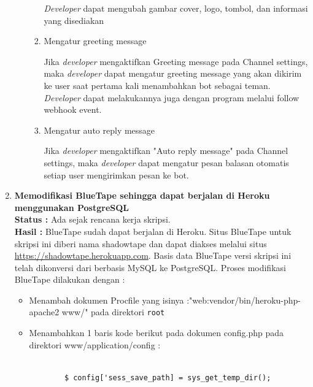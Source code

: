 \documentclass[a4paper,twoside]{article}
\begin{document}
\begin{enumerate}
\begin{enumerate}
\begin{enumerate}
\textit{Developer} dapat mengubah gambar cover, logo, tombol, dan informasi yang disediakan

\item Mengatur greeting message

Jika \textit{developer} mengaktifkan Greeting message pada Channel settings, maka \textit{developer} dapat mengatur greeting message yang akan dikirim ke user saat pertama kali menambahkan bot sebagai teman. \textit{Developer} dapat melakukannya juga dengan program melalui follow webhook event.

\item Mengatur auto reply message

Jika \textit{developer} mengaktifkan "Auto reply message" pada Channel settings, maka \textit{developer} dapat mengatur pesan balasan otomatis setiap user mengirimkan pesan ke bot.
\end{enumerate}
	
	\end{enumerate}
		
	\item \textbf{Memodifikasi BlueTape sehingga dapat berjalan di Heroku menggunakan PostgreSQL}\\
	{\bf Status :} Ada sejak rencana kerja skripsi.\\
	{\bf Hasil :} BlueTape sudah dapat berjalan di Heroku. Situs BlueTape untuk skripsi ini diberi nama shadowtape dan dapat diakses melalui situs \url{https://shadowtape.herokuapp.com}. Basis data BlueTape versi skripsi ini telah dikonversi dari berbasis MySQL ke PostgreSQL. Proses modifikasi BlueTape dilakukan dengan :
	\begin{itemize}
		\item Menambah dokumen Procfile yang isinya :"web:vendor/bin/heroku-php-apache2 www/" pada direktori \texttt{root}
		\item Menambahkan 1 baris kode berikut pada dokumen config.php pada direktori www/application/config : 
		\begin{lstlisting}
		
		$ config['sess_save_path] = sys_get_temp_dir();
		

\end{lstlisting}
\end{itemize}
\end{enumerate}
\end{document}
